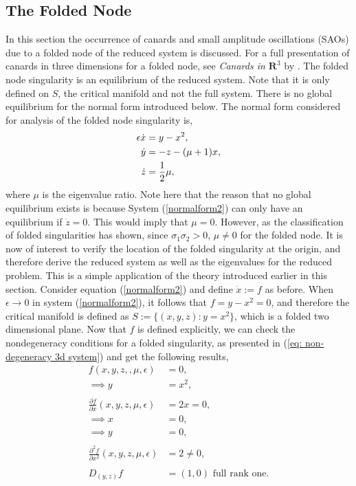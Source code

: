 \subsection{The Folded Node}
In this section the occurrence of canards and small amplitude oscillations (SAOs) due to a folded node of the reduced system is discussed. For a full presentation of canards in three dimensions for a folded node, see \textit{Canards in $ \mathbf{R}^3 $} by  \citet{wechselberger2005}.
The folded node singularity is an equilibrium of the reduced system. Note that it is only defined on $S$, the critical manifold and not the full system. There is no global equilibrium for the normal form introduced below.
The normal form considered for analysis of the folded node singularity is,
\begin{align}\label{normalform2}
\epsilon \dot{x} &= y - x^2,\\ \notag
\dot{y} &=- z -(\mu +1)x, \\
\dot{z} &= \frac{1}{2} \mu, \notag
\end{align}
where $\mu$ is the eigenvalue ratio. Note here that the reason that no global equilibrium exists is because System (\ref{normalform2}) can only have an equilibrium if $\dot{z} =0$. This would imply that $\mu=0$. However, as the classification of folded singularities has shown, since $\sigma_1 \sigma_2 >0$,  $\mu \neq 0$ for the folded node.
It is now of interest to verify the location of the folded singularity at the origin, and therefore derive the reduced system as well as the eigenvalues for the reduced problem.
This is a simple application of the theory introduced earlier in this section.
Consider equation (\ref{normalform2}) and define $\dot{x}:=f$ as before. When $\epsilon \to 0$ in system (\ref{normalform2}), it follows that $f= y-x^2 =0$, and therefore the critical manifold is defined as $S:= \{ (x,y,z) : y=x^2\}$, which is a folded two dimensional plane.
Now that $f$ is defined explicitly, we can check the nondegeneracy conditions for a folded singularity, as presented in (\ref{eq: non-degeneracy 3d system}) and get the following results,
\begin{align*}
f(x,y,z,,\mu, \epsilon) &= 0,\\
\implies y&=x^2,\\
\\
\frac{\partial f}{\partial x} (x,y,z,\mu,\epsilon) &= 2x = 0,\\
\implies x&=0, \\
\implies y&=0, \\
\\
\frac{\partial^2 f}{\partial x^2}(x,y,z,\mu,\epsilon) & = 2 \neq 0,\\
\\
D_{(y,z)}f&= (1,0) \textrm{ full rank one}.
\end{align*}
